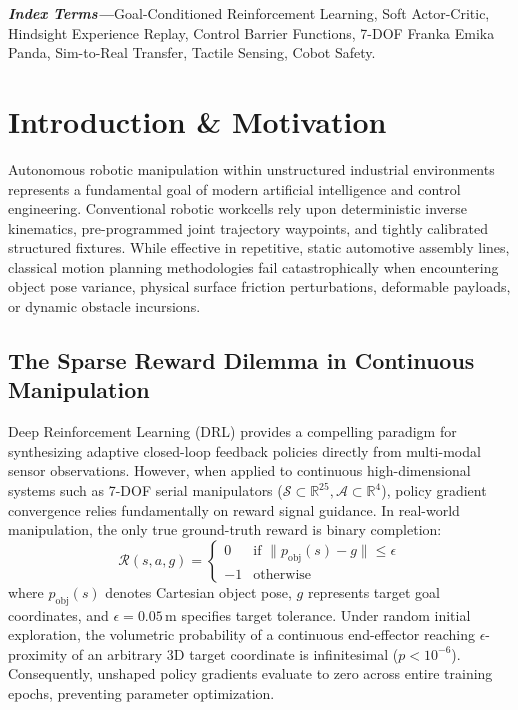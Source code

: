 \documentclass[10pt,twocolumn,a4paper]{article}
\newcommand{\R}{\mathbb{R}}
\newcommand{\A}{\mathcal{A}}
\newcommand{\Scal}{\mathcal{S}}
\begin{document}
\textbf{\textit{Index Terms—}}Goal-Conditioned Reinforcement Learning, Soft Actor-Critic, Hindsight Experience Replay, Control Barrier Functions, 7-DOF Franka Emika Panda, Sim-to-Real Transfer, Tactile Sensing, Cobot Safety.

\section{Introduction \& Motivation}
\label{sec:intro}
Autonomous robotic manipulation within unstructured industrial environments represents a fundamental goal of modern artificial intelligence and control engineering. Conventional robotic workcells rely upon deterministic inverse kinematics, pre-programmed joint trajectory waypoints, and tightly calibrated structured fixtures. While effective in repetitive, static automotive assembly lines, classical motion planning methodologies fail catastrophically when encountering object pose variance, physical surface friction perturbations, deformable payloads, or dynamic obstacle incursions.

\subsection{The Sparse Reward Dilemma in Continuous Manipulation}
Deep Reinforcement Learning (DRL) provides a compelling paradigm for synthesizing adaptive closed-loop feedback policies directly from multi-modal sensor observations. However, when applied to continuous high-dimensional systems such as 7-DOF serial manipulators ($\Scal \subset \R^{25}, \A \subset \R^4$), policy gradient convergence relies fundamentally on reward signal guidance. In real-world manipulation, the only true ground-truth reward is binary completion:
\begin{equation}
  \mathcal{R}(s, a, g) = \begin{cases} 0 & \text{if } \|p_{\text{obj}}(s) - g\| \le \epsilon \\ -1 & \text{otherwise} \end{cases}
  \label{eq:sparse_reward}
\end{equation}
where $p_{\text{obj}}(s)$ denotes Cartesian object pose, $g$ represents target goal coordinates, and $\epsilon = 0.05\,\text{m}$ specifies target tolerance. Under random initial exploration, the volumetric probability of a continuous end-effector reaching $\epsilon$-proximity of an arbitrary 3D target coordinate is infinitesimal ($p < 10^{-6}$). Consequently, unshaped policy gradients evaluate to zero across entire training epochs, preventing parameter optimization.
\end{document}
